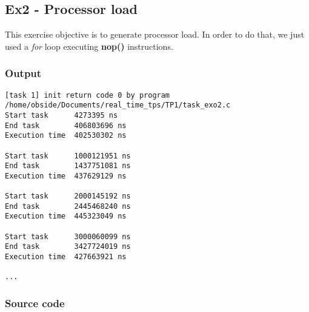 \subsection{Ex2 - Processor load}
This exercise objective is to generate processor load. In order to do that, we just used a \emph{for} loop executing \textbf{nop()} instructions.

\subsubsection{Output}
\begin{lstlisting}[keywordstyle=\color{black}]
[task 1] init return code 0 by program /home/obside/Documents/real_time_tps/TP1/task_exo2.c
Start task		4273395 ns
End task		406803696 ns
Execution time	402530302 ns

Start task		1000121951 ns
End task		1437751081 ns
Execution time	437629129 ns

Start task		2000145192 ns
End task		2445468240 ns
Execution time	445323049 ns

Start task		3000060099 ns
End task		3427724019 ns
Execution time	427663921 ns

...
\end{lstlisting}

\subsubsection{Source code}

